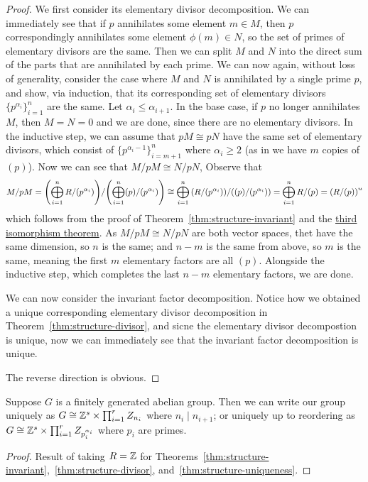 \begin{proof}
    We first consider its elementary divisor decomposition.
    We can immediately see that if \(p\) annihilates some element \(m \in M\),
    then \(p\) correspondingly annihilates some element \(\phi(m) \in N\),
    so the set of primes of elementary divisors are the same.
    Then we can split \(M\) and \(N\) into the direct sum of the parts that are annihilated by each prime.
    We can now again, without loss of generality,
    consider the case where \(M\) and \(N\) is annihilated by a single prime \(p\),
    and show, via induction,
    that its corresponding set of elementary divisors \({\{p^{\alpha_i}\}}_{i=1}^n\) are the same.
    Let \(\alpha_i \leq \alpha_{i+1}\).
    In the base case, if \(p\) no longer annihilates \(M\),
    then \(M = N = 0\) and we are done, since there are no elementary divisors.
    In the inductive step,
    we can assume that \(pM \cong pN\) have the same set of elementary divisors,
    which consist of \({\{p^{\alpha_i-1}\}}_{i=m+1}^n\) where \(\alpha_i \geq 2\)
    (as in we have \(m\) copies of \((p)\)).
    Now we can see that \(M/pM \cong N/pN\),
    Observe that
    \begin{equation*}
        M/pM = \pqty{\bigoplus_{i=1}^n R/(p^{\alpha_i})}/\pqty{\bigoplus_{i=1}^n (p)/(p^{\alpha_i})}
        \cong \bigoplus_{i=1}^n \pqty{R/(p^{\alpha_i})}/\pqty{(p)/(p^{\alpha_i})}
        = \bigoplus_{i=1}^n R/(p)
        = \pqty{R/(p)}^n
    \end{equation*}
    which follows from the proof of Theorem~\ref{thm:structure-invariant}
    and the \hyperref[thm:iso-3-mod]{third isomorphism theorem}.
    As \(M/pM \cong N/pN\) are both vector spaces,
    thet have the same dimension, so \(n\) is the same;
    and \(n-m\) is the same from above,
    so \(m\) is the same,
    meaning the first \(m\) elementary factors are all \((p)\).
    Alongside the inductive step, which completes the last \(n-m\) elementary factors, we are done.

    We can now consider the invariant factor decomposition.
    Notice how we obtained a unique corresponding elementary divisor decomposition
    in Theorem~\ref{thm:structure-divisor},
    and sicne the elementary divisor decompostion is unique,
    now we can immediately see that the invariant factor decomposition is unique.

    The reverse direction is obvious.
\end{proof}

\begin{corollary}
    Suppose \(G\) is a finitely generated abelian group.
    Then we can write our group uniquely as
    \(G \cong \mathbb{Z}^s \times \prod_{i=1}^r Z_{n_i}\)
    where \(n_i \mid n_{i+1}\);
    or uniquely up to reordering as
    \(G \cong \mathbb{Z}^s \times \prod_{i=1}^r Z_{p_i^{\alpha_i}}\)
    where \(p_i\) are primes.
\end{corollary}
\begin{proof}
    Result of taking \(R = \mathbb{Z}\)
    for Theorems~\ref{thm:structure-invariant},~\ref{thm:structure-divisor},
    and~\ref{thm:structure-uniqueness}.
\end{proof}

